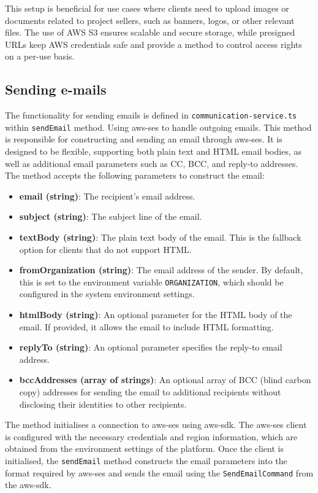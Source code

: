 This setup is beneficial for use cases where clients need to upload images or documents related to project sellers, such as banners, logos, or other relevant files. 
The use of AWS S3 ensures scalable and secure storage, while presigned URLs keep AWS credentials safe and provide a method to control access rights on a per-use basis.

\subsection{Sending e-mails}
The functionality for sending emails is defined in \texttt{communication-service.ts} within \texttt{sendEmail} method.
Using \gls{aws-ses} to handle outgoing emails.
This method is responsible for constructing and sending an email through \gls{aws-ses}. It is designed to be flexible, supporting both plain text and HTML email bodies, as well as additional email parameters such as CC, BCC, and reply-to addresses.
The method accepts the following parameters to construct the email:
\begin{itemize}
    \item \textbf{email (string)}: The recipient's email address.
    \item \textbf{subject (string)}: The subject line of the email.
    \item \textbf{textBody (string)}: The plain text body of the email. This is the fallback option for clients that do not support HTML.
    \item \textbf{fromOrganization (string)}: The email address of the sender. By default, this is set to the environment variable \texttt{ORGANIZATION}, which should be configured in the system environment settings.
    \item \textbf{htmlBody (string)}: An optional parameter for the HTML body of the email. If provided, it allows the email to include HTML formatting.
    \item \textbf{replyTo (string)}: An optional parameter specifies the reply-to email address.
    \item \textbf{bccAddresses (array of strings)}: An optional array of BCC (blind carbon copy) addresses for sending the email to additional recipients without disclosing their identities to other recipients.
\end{itemize}
The method initialises a connection to \gls{aws-ses} using \gls{aws-sdk}. 
The \gls{aws-ses} client is configured with the necessary credentials and region information, which are obtained from the environment settings of the platform. Once the client is initialised, the \texttt{sendEmail} method constructs the email parameters into the format required by \gls{aws-ses} and sends the email using the \texttt{SendEmailCommand} from the \gls{aws-sdk}.




